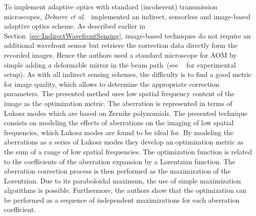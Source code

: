 To implement adaptive optics with standard (incoherent) transmission microscopes, \emph{Debarre et al.}~\cite{wide_AOM_loew_freq} implemented an indirect, sensorless and image-based adaptive optics scheme. As described earlier in Section~\ref{sec:IndirectWavefrontSensing}, image-based techniques do not require an additional wavefront sensor but retrieve the correction data directly form the recorded images. Hence the authors used a standard microscope for AOM by simple adding a deformable mirror in the beam path~(see ~\cite{wide_AOM_loew_freq} for experimental setup). As with all indirect sensing schemes, the difficulty is to find a good metric for image quality, which allows to determine the appropriate correction parameters. The presented method uses low spatial frequency content of the image as the optimization metric. The aberration is represented in terms of Lukosz modes which are based on Zernike polynomials. The presented technique consists on modeling the effects of aberrations on the imaging of low spatial frequencies, which Lukosz modes are found to be ideal for. By modeling the aberrations as a series of Lukosz modes they develop an optimization metric as the sum of a range of low spatial frequencies. The optimization function is related to the coefficients of the aberration expansion by a Lorentzian function. The aberration correction process is then performed as the maximization of the Lorentzian. Due to its paraboloidal maximum, the use of simple maximization algorithms is possible. Furthermore, the authors show that the optimization can be performed as a sequence of independent maximizations for each aberration coefficient.

